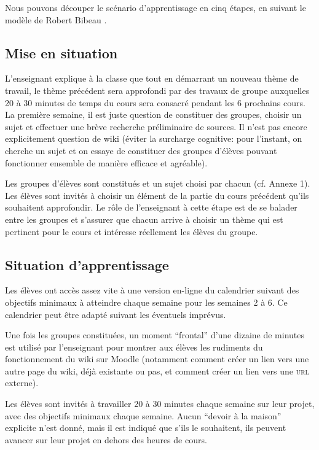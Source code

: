 \documentclass[11pt,bibliography=totoc]{scrartcl}
\begin{document}
Nous pouvons découper le scénario d'apprentissage en cinq étapes, en suivant le
modèle de Robert Bibeau \autocite{bibeau}.

\subsection{Mise en situation}
L'enseignant explique à la classe que tout en démarrant un nouveau thème de
travail, le thème précédent sera approfondi par des travaux de groupe auxquelles
20 à 30 minutes de temps du cours sera consacré pendant les 6 prochains cours.
La première semaine, il est juste question de constituer des groupes, choisir un
sujet et effectuer une brève recherche préliminaire de sources. Il n'est pas
encore explicitement question de wiki (éviter la surcharge cognitive: pour
l'instant, on cherche un sujet et on essaye de constituer des groupes d'élèves
pouvant fonctionner ensemble de manière efficace et agréable).

Les groupes d'élèves sont constitués et un sujet choisi par chacun (cf. Annexe
1). Les élèves sont invités à choisir un élément de la partie du cours précédent
qu'ils souhaitent approfondir. Le rôle de l'enseignant à cette étape est de se
balader entre les groupes et s'assurer que chacun arrive à choisir un thème qui
est pertinent pour le cours et intéresse réellement les élèves du groupe.

\subsection{Situation d'apprentissage}
Les élèves ont accès assez vite à une version en-ligne du calendrier suivant des
objectifs minimaux à atteindre chaque semaine pour les semaines 2 à 6. Ce
calendrier peut être adapté suivant les éventuels imprévus.

Une fois les groupes constituées, un moment ``frontal'' d'une dizaine de minutes
est utilisé par l'enseignant pour montrer aux élèves les rudiments du
fonctionnement du wiki sur Moodle (notamment comment créer un lien vers une
autre page du wiki, déjà existante ou pas, et comment créer un lien vers une
\textsc{url} externe).

Les élèves sont invités à travailler 20 à 30 minutes chaque semaine sur leur
projet, avec des objectifs minimaux chaque semaine. Aucun ``devoir à la maison''
explicite n'est donné, mais il est indiqué que s'ils le souhaitent, ils peuvent
avancer sur leur projet en dehors des heures de cours.
\end{document}
